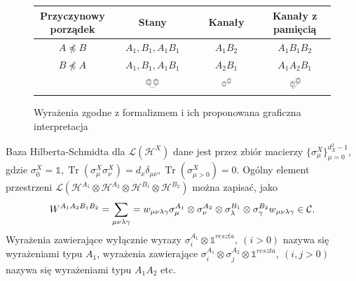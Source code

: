 \documentclass[10pt]{article} %
\DeclareMathOperator{\Trs}{Tr}
\newcommand{\Mats}[1]{\mathcal{L}(#1)}
\newcommand{\Hx}[1]{\mathcal{H}^{#1}}
\newcommand{\LHx}[1]{\Mats{\Hx{#1}}}
\newcommand{\Tr}[1]{\Trs(#1)}
\newcommand{\WAll}{W^{A_1A_2B_1B_2}}
\begin{document}
\begin{figure}[t]
\centering

\begin{tabular}{|c|c|c|c|}
\hline
Przyczynowy porządek & Stany & Kanały & Kanały z pamięcią \\
\hline
$A \npreceq B $ & $A_1, B_1, A_1B_1$ & $A_1B_2$ & $A_1B_1B_2$\\
\hline
$B \npreceq A $ & $A_1, B_1, A_1B_1$ & $A_2B_1$ & $A_1A_2B_1$\\ 
\hline
& \includegraphics[width=0.2\textwidth]{obrazki/states} & \includegraphics[width=0.2\textwidth]{obrazki/channel}& \includegraphics[width=0.2\textwidth]{obrazki/channel_with_memory}\\
\hline
\end{tabular}
\caption{Wyrażenia zgodne z formalizmem i ich proponowana graficzna interpretacja}
\label{fig:configs}
\end{figure}
Baza Hilberta-Schmidta dla $\LHx{X}$ dane jest przez zbiór macierzy $\{\sigma^X_\mu\}^{d^2_X-1}_{\mu=0},$ gdzie $\sigma^X_0 = \mathbb{1}, \Tr{\sigma^X_\mu\sigma^X_\nu}=d_x\delta_{\mu\nu}, \Tr{\sigma^X_{\mu>0}}=0.$ Ogólny element przestrzeni $\Mats{\Hx{A_1}\otimes\Hx{A_2}\otimes\Hx{B_1}\otimes\Hx{B_2}}$ można zapisać, jako
\begin{equation}
\WAll = \sum_{\mu\nu\lambda\gamma}= w_{\mu\nu\lambda\gamma} \sigma_\mu^{A_1}\otimes\sigma_\nu^{A_2}\otimes\sigma_\lambda^{B_1}\otimes\sigma_\gamma^{B_2} \\
w_{\mu\nu\lambda\gamma} \in \mathcal{C}.
\end{equation}
Wyrażenia zawierające wyłącznie wyrazy $\sigma^{A_1}_i \otimes \mathbb{1}^{reszta},~(i > 0)$ nazywa się wyrażeniami typu $A_1$, wyrażenia zawierające  $\sigma^{A_1}_i \otimes \sigma^{A_2}_j \otimes \mathbb{1}^{reszta},~(i, j > 0)$ nazywa się wyrażeniami typu $A_1A_2$ etc.
\end{document}
